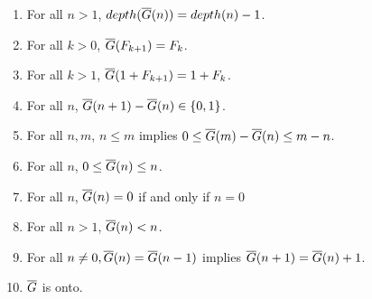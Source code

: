 \documentclass[a4paper,11pt]{article}
\begin{document}
\begin{theorem}\label{FGprops}
\noindent
\begin{enumerate}
\item For all $n>1$, $depth(\overline{G}(n)) = depth(n)-1$.
\item For all $k>0$, $\overline{G}(F_{k+1}) = F_k$.
\item For all $k>1$, $\overline{G}(1+F_{k+1}) = 1+F_k$.
\item For all $n$, $\overline{G}(n+1)-\overline{G}(n) \in \{0,1\}$.
\item For all $n,m$, $n\le m$ implies $0 \le \overline{G}(m)-\overline{G}(n) \le m-n$.
\item For all $n$, $0 \le \overline{G}(n) \le n$.
\item For all $n$, $\overline{G}(n)=0$ if and only if $n=0$
\item For all $n>1$, $\overline{G}(n)<n$.
\item For all $n\neq 0, \overline{G}(n)=\overline{G}(n-1)$ implies $\overline{G}(n+1)=\overline{G}(n)+1$.
\item $\overline{G}$ is onto.
\end{enumerate}
\end{theorem}
\end{document}
